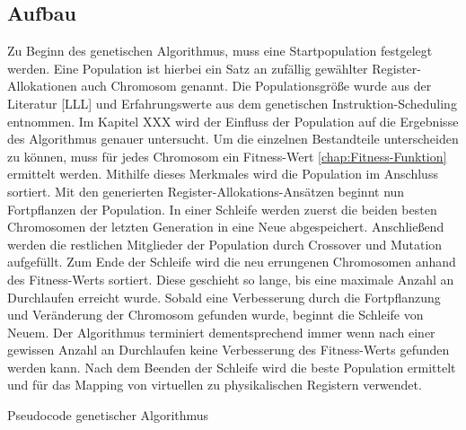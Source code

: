 \subsection{Aufbau}
\label{chap:aufbau}
Zu Beginn des genetischen Algorithmus, muss eine Startpopulation festgelegt werden. Eine Population ist hierbei ein Satz an zufällig gewählter Register-Allokationen auch Chromosom genannt. Die Populationsgröße wurde aus der Literatur [LLL] und Erfahrungswerte aus dem genetischen Instruktion-Scheduling entnommen. Im Kapitel XXX wird der Einfluss der Population auf die Ergebnisse  des Algorithmus genauer untersucht.
Um die einzelnen Bestandteile unterscheiden zu können, muss für jedes Chromosom ein Fitness-Wert \ref{chap:Fitness-Funktion} ermittelt werden. Mithilfe dieses Merkmales wird die Population im Anschluss sortiert. 
Mit den generierten Register-Allokations-Ansätzen beginnt nun Fortpflanzen der Population. In einer Schleife werden zuerst die beiden besten Chromosomen der letzten Generation in eine Neue abgespeichert. Anschließend werden die restlichen Mitglieder der Population durch Crossover und Mutation aufgefüllt. Zum Ende der Schleife wird die neu errungenen Chromosomen anhand des Fitness-Werts sortiert. Diese geschieht so lange, bis eine maximale Anzahl an Durchlaufen erreicht wurde. Sobald eine Verbesserung durch die Fortpflanzung und Veränderung der Chromosom gefunden wurde, beginnt die Schleife von Neuem. Der Algorithmus terminiert dementsprechend immer wenn nach einer gewissen Anzahl an Durchlaufen keine Verbesserung des Fitness-Werts gefunden werden kann. Nach dem Beenden der Schleife wird die beste Population ermittelt und für das Mapping von virtuellen zu physikalischen Registern verwendet.

\begin{algorithm}[H]
	\begin{algorithmic}[1]
%		
		 
		\ENDFOR
		\ENDIF
	\ENDWHILE
	\caption{Pseudocode genetischer Algorithmus}
\end{algorithmic}
\end{algorithm}

